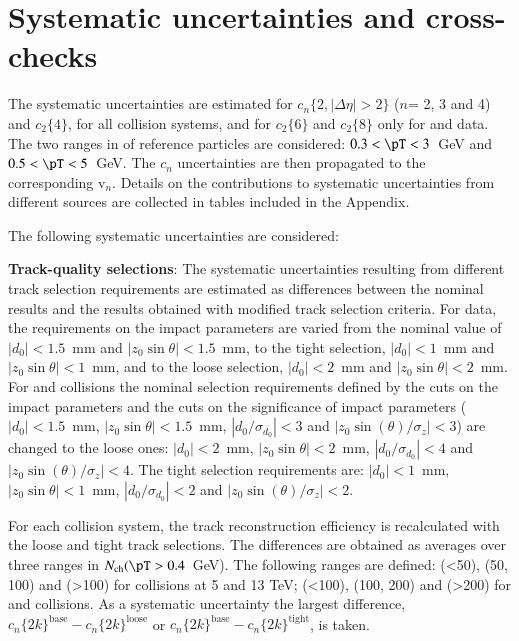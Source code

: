 \documentclass[cernpreprint,texlive=2014,txfonts,UKenglish]{latex/atlasdoc}
\begin{document}
\section{Systematic uncertainties and cross-checks}
\label{sec:syst}
\noindent
The systematic uncertainties are estimated for $c_n\{2,|\Delta\eta|>2\}$ ($n$= 2, 3 and 4) and $c_2\{4\}$, for all collision systems, and for $c_2\{6\}$ and $c_2\{8\}$ only for \pPb and \PbPb data. The two ranges in \pT of reference particles are considered: $0.3 < \pT < 3$~GeV and $0.5 < \pT < 5$~GeV. The $c_n$ uncertainties are then propagated to the corresponding $\mathrm{v}_n$.  Details on the contributions to systematic uncertainties from different sources are collected in tables included in the Appendix.

The following systematic uncertainties are considered: 

\noindent

\noindent
\textbf{Track-quality selections}: The systematic uncertainties resulting from different track selection requirements are estimated as differences between the nominal results and the results obtained with modified track selection criteria. For \pp data, the requirements on the impact parameters are varied from the nominal value of $|d_0| < 1.5$~mm and $|z_0 \sin \theta| < 1.5$~mm, to the tight selection, $|d_0| < 1$~mm and $|z_0 \sin \theta| < 1$~mm,  and to the loose selection, $|d_0| < 2$~mm and $|z_0 \sin \theta| < 2$~mm. For \pPb and \PbPb collisions the nominal selection requirements defined by the cuts on the impact parameters and the cuts on the significance of impact parameters ($|d_0| < 1.5$~mm, $|z_0 \sin \theta| < 1.5$~mm, $|d_0/\sigma_{d_0}|<3$ and $|z_0\sin(\theta)/\sigma_z|<3$) are changed to the loose ones: $|d_0| < 2$~mm, $|z_0 \sin \theta| < 2$~mm, $|d_0/\sigma_{d_0}|<4$ and $|z_0\sin(\theta)/\sigma_z|<4$. The tight selection requirements are: $|d_0| < 1$~mm, $|z_0 \sin \theta| < 1$~mm, $|d_0/\sigma_{d_0}|<2$ and $|z_0\sin(\theta)/\sigma_z|<2$. 

For each collision system, the track reconstruction efficiency is recalculated with the loose and tight track selections. The differences are obtained as averages over three ranges in $N_{\mathrm{ch}} (\pT > 0.4$~GeV). The following ranges are defined: (<50), (50, 100) and (>100) for \pp collisions at 5 and 13 TeV; (<100), (100, 200) and (>200) for \pPb and \PbPb collisions. As a systematic uncertainty the largest difference,
$c_n\{2k\}^{\mathrm{base}} - c_n\{2k\}^{\mathrm{loose}}$ or $c_n\{2k\}^{\mathrm{base}} - c_n\{2k\}^{\mathrm{tight}}$, is taken. 
\end{document}
